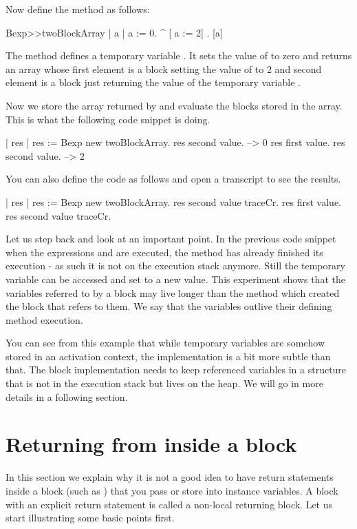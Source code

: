 \documentclass[a4paper,10pt,twoside]{book}
\begin{document}
Now define the method  as follows:

\begin{code}{}
Bexp>>twoBlockArray
	| a |
	a := 0.
	^ {[ a := 2] . [a]}
\end{code}

The method  defines a temporary variable . It sets the value of 
to zero and returns an array whose first element is a block setting the value of  to 2 and second element is a block just returning the value of the temporary variable .

Now we store the array returned by  and evaluate the blocks stored in the array. This is what the following code snippet is doing.

\begin{code}{}
| res |
res := Bexp new twoBlockArray.
res second value. --> 0
res first value.
res second value. --> 2
\end{code}

You can also define the code as follows and open a transcript to see the results.

\begin{code}
| res |
res := Bexp new twoBlockArray.
res second value traceCr.
res first value.
res second value traceCr.
\end{code}

Let us step back and look at an important point.
In the previous code snippet when the expressions  and  are executed, the method  has already finished its execution - as such it is not on the execution stack anymore.  Still the temporary variable  can be accessed and set to a new value. This experiment shows that the variables referred to by a block may live longer than the method which created the block that refers to them. We say that the variables outlive their defining method execution.

 You can see from this example that while temporary variables are somehow stored in an activation context, the implementation is a bit more subtle than that. The block implementation needs to keep referenced variables in a structure that is not in the execution stack but lives on the heap. We will go in more details in a following section.


\section{Returning from inside a block}
In this section we explain why it is  not a good idea to have return statements inside a block (such as \ct{[^ 33]}) that you pass or store into instance variables. A block with an explicit return statement is called a non-local returning block. Let us start illustrating some basic points first.
\end{document}
